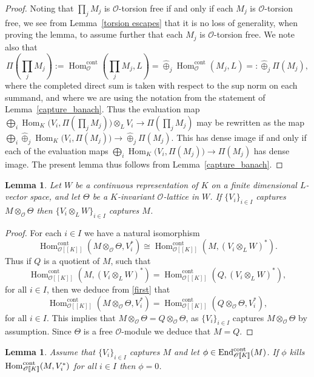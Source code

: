 \documentclass[JEP,XML,SOM,Unicode,NoEqCountersInSection]{cedram}
\let\mathcal\mathscr
\newtheorem{lem}[prop]{Lemma}
\theoremstyle{definition}
\DeclareMathOperator{\End}{End}
\DeclareMathOperator{\Hom}{Hom}
\newcommand{\br}[1]{[\![#1]\!]}
\newcommand{\cO}{\mathcal{O}}
\newcommand{\cont}{\mathrm{cont}}
\begin{document}
\begin{proof}
Noting that $\prod_j M_j$ is $\cO$-torsion free if and only if each
$M_j$ is $\cO$-torsion free, we see from Lemma~\ref{torsion escapes}
that it is no loss of generality, when proving the lemma, to assume
further that each $M_j$ is $\cO$-torsion free. We note also that
\[\textstyle
\Pi(\prod_j M_j) := \Hom^{\cont}_{\cO}(\prod_j M_j, L) = \widehat{\oplus}_j
\Hom^{\cont}_{\cO}(M_j, L) =: \widehat{\oplus}_j \Pi(M_j),
\]
where the completed direct sum is taken with respect to the sup norm on
each summand, and where we are using the notation from the statement
of Lemma~\ref{capture_banach}.
Thus the evaluation map
$\bigoplus_i \Hom_K\bigl(V_i, \Pi(\prod_j M_j )\bigr) \otimes_L V_i
\to \Pi(\prod_j M_j)$
may be rewritten as the map
$\bigoplus_i \widehat{\oplus}_j \Hom_K\bigl(V_i, \Pi(M_j)\bigr)
\to \widehat{\oplus}_j \Pi(M_j).$
This has dense image if and only if each of the evaluation maps
$\bigoplus_i \Hom_K\bigl(V_i, \Pi(M_j)\bigr) \to \Pi(M_j)$
has dense image. The present lemma thus follows from
Lemma~\ref{capture_banach}.
\end{proof}

\begin{lem}\label{weight} Let $W$ be a continuous representation of $K$ on a finite dimensional $L$\nobreakdash-vector space, and let $\Theta$ be a $K$-invariant $\cO$-lattice in $W$.
If $\{V_i\}_{i\in I}$ captures $M\otimes_{\cO} \Theta$ then $\{V_i\otimes_L W\}_{i\in I}$ captures $M$.
\end{lem}

\begin{proof} For each $i\in I$ we have a natural isomorphism
\begin{equation}\label{first}
\Hom_{\cO\br{K}}^{\cont}(M\otimes_{\cO} \Theta, V_i^*)\cong \Hom_{\cO\br{K}}^{\cont}(M, (V_i\otimes_L W)^*).
\end{equation}
Thus if $Q$ is a quotient of $M$, such that
\[
\Hom_{\cO\br{K}}^{\cont}(M, (V_i\otimes_L W)^*)=\Hom_{\cO\br{K}}^{\cont}(Q, (V_i\otimes_L W)^*),
\]
for all $i\in I$, then we deduce from
\eqref{first} that
\[
\Hom_{\cO\br{K}}^{\cont}(M\otimes_{\cO} \Theta, V_i^*)=\Hom_{\cO\br{K}}^{\cont}(Q\otimes_{\cO} \Theta, V_i^*),
\]
for all $i\in I$. This implies that
$M\otimes_{\cO} \Theta= Q\otimes_{\cO} \Theta$, as $\{V_i\}_{i\in I}$ captures $M\otimes_{\cO} \Theta$ by assumption. Since $\Theta$ is a free $\cO$-module we deduce that
$M=Q$.
\end{proof}

\begin{lem}\label{faithful} Assume that $\{ V_i\}_{i\in I}$ captures $M$ and let $\phi\in \End_{\cO\br{K}}^{\rm cont}(M)$. If $\phi$ kills
$\Hom_{\cO\br{K}}^{\rm cont}(M, V_i^*)$ for all $i\in I$ then $\phi=0$.
\end{lem}
\end{document}
